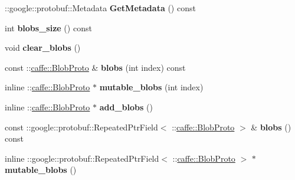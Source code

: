 \begin{DoxyCompactItemize}
\+::google\+::protobuf\+::\+Metadata {\bfseries Get\+Metadata} () const
\item 
\mbox{\label{classcaffe_1_1_blob_proto_vector_a050d9feb39c79e46253c0190a6ad2b49}} 
int {\bfseries blobs\+\_\+size} () const
\item 
\mbox{\label{classcaffe_1_1_blob_proto_vector_a05a473e12d698929781b00577bec2652}} 
void {\bfseries clear\+\_\+blobs} ()
\item 
\mbox{\label{classcaffe_1_1_blob_proto_vector_aa629669b2a9329ded0e241839287acb0}} 
const \+::\mbox{\hyperlink{classcaffe_1_1_blob_proto}{caffe\+::\+Blob\+Proto}} \& {\bfseries blobs} (int index) const
\item 
\mbox{\label{classcaffe_1_1_blob_proto_vector_a7885f15b8dadfbada40362fa8e04e25b}} 
inline \+::\mbox{\hyperlink{classcaffe_1_1_blob_proto}{caffe\+::\+Blob\+Proto}} $\ast$ {\bfseries mutable\+\_\+blobs} (int index)
\item 
\mbox{\label{classcaffe_1_1_blob_proto_vector_a2fde2b701600493108ceac0d34811223}} 
inline \+::\mbox{\hyperlink{classcaffe_1_1_blob_proto}{caffe\+::\+Blob\+Proto}} $\ast$ {\bfseries add\+\_\+blobs} ()
\item 
\mbox{\label{classcaffe_1_1_blob_proto_vector_a47532413222499546887018ce3ce0b04}} 
const \+::google\+::protobuf\+::\+Repeated\+Ptr\+Field$<$ \+::\mbox{\hyperlink{classcaffe_1_1_blob_proto}{caffe\+::\+Blob\+Proto}} $>$ \& {\bfseries blobs} () const
\item 
\mbox{\label{classcaffe_1_1_blob_proto_vector_add70a7e77d6df95875ebbf04bd0dd076}} 
inline \+::google\+::protobuf\+::\+Repeated\+Ptr\+Field$<$ \+::\mbox{\hyperlink{classcaffe_1_1_blob_proto}{caffe\+::\+Blob\+Proto}} $>$ $\ast$ {\bfseries mutable\+\_\+blobs} ()
\end{DoxyCompactItemize}
